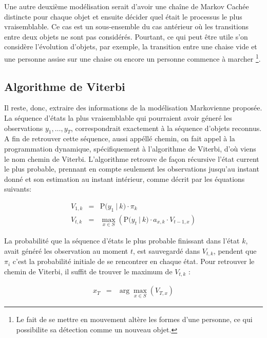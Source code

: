 Une autre deuxième modélisation serait d'avoir une chaîne de Markov
Cachée distincte pour chaque objet et ensuite décider quel était le
processus le plus vraisemblable. Ce cas est un sous-ensemble du cas
antérieur où les transitions entre deux objets ne sont pas
considérés. Pourtant, ce qui peut être utile s'on considère
l'évolution d'objets, par exemple, la transition entre une chaise vide
et une personne assise sur une chaise ou encore un personne
commence à marcher \footnote{Le fait de se mettre en mouvement
  altère les formes d'une personne, ce qui possibilite sa détection
  comme un nouveau objet.}.

\subsection{Algorithme de Viterbi}

Il reste, donc, extraire des informations de la modélisation Markovienne proposée.
La séquence d'états la plus vraisemblable qui pourraient avoir géneré
les observations  $y_1,\dots, y_T$, correspondrait exactement à la séquence d'objets reconnus.
A fin de retrouver cette séquence, aussi appéllé chemin, on fait 
appel à la programmation dynamique, spécifiquement à l'algorithme de Viterbi, d'où viens le nom chemin de Viterbi.
L'algorithme retrouve de façon récursive l'état current le plus probable, 
prennant en compte seulement les observations jusqu'au instant donné et son
estimation au instant intérieur, comme décrit par les équations suivants:

\begin{equation*}
  \begin{array}{rcl}
    V_{1,k} &=& \mathrm{P}\big( y_1 \ | \ k \big) \cdot \pi_k \\
    V_{t,k} &=& \max_{x \in S} \left(  \mathrm{P}\big( y_t \ | \ k \big) \cdot a_{x,k} \cdot V_{t-1,x}\right)
  \end{array}
\end{equation*}

La probabilité que la séquence d'états le plus probable finissant dans l'état $k$, avait généré les observation au moment $t$, est sauvegardé dans $V_{t,k}$, pendent que $\pi_i$ c'est la probabilité initiale de se rencontrer en chaque état. Pour retrouver le chemin de Viterbi, il suffit de trouver le maximum de $V_{t,k}$ :

\begin{equation*}
  \begin{array}{rcl}
    x_T &=& \arg\max_{x \in S} (V_{T,x})
  \end{array}
\end{equation*}

